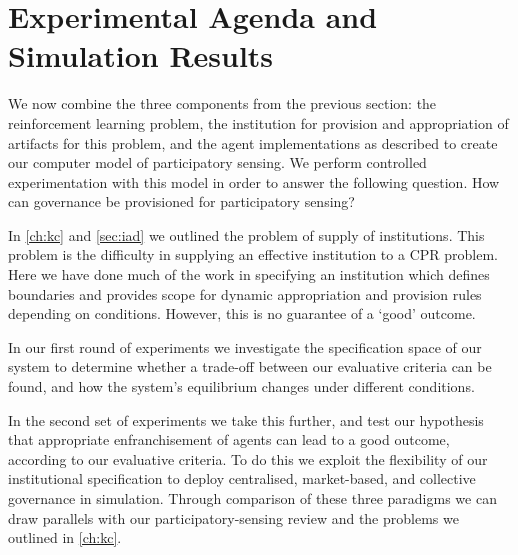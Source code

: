 \section{Experimental Agenda and Simulation Results}

We now combine the three components from the previous section: the reinforcement learning problem, the institution for provision and
appropriation of artifacts for this problem, and the agent implementations as
described to create our computer model of participatory sensing. We perform
controlled experimentation with this model in order to answer the following question.
How can governance be provisioned for participatory sensing?

In \autoref{ch:kc} and \autoref{sec:iad} we outlined the problem of supply of
institutions. This problem is the difficulty in supplying an effective institution to
a \ac{CPR} problem. Here we have done much of the work in specifying an
institution which defines boundaries and provides scope for dynamic
appropriation and provision rules depending on conditions. However, this is no
guarantee of a `good' outcome. 

In our first round of experiments we investigate
the specification space of our system to determine whether a trade-off between
our evaluative criteria can be found, and how the system's equilibrium changes
under different conditions.

In the second set of experiments we take this further, and test our hypothesis
that appropriate enfranchisement of agents can lead to a good outcome,
according to our evaluative criteria. To do this we exploit the flexibility of
our institutional specification to deploy centralised, market-based, and
collective governance in simulation. Through comparison of these three
paradigms we can draw parallels with our participatory-sensing review and the
problems we outlined in \autoref{ch:kc}.



